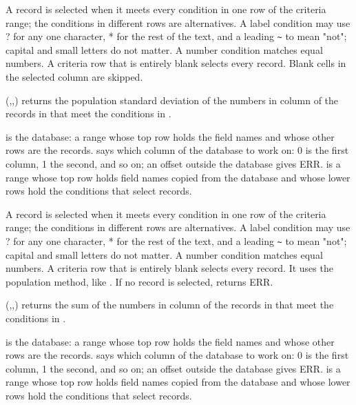 A record is selected when it meets every condition in one row of the criteria range; the conditions in different rows are alternatives. A label condition may use ? for any one character, * for the rest of the text, and a leading \texttt{\textasciitilde} to mean "not"; capital and small letters do not matter. A number condition matches equal numbers. A criteria row that is entirely blank selects every record. Blank cells in the selected column are skipped.

\Examples
{}

(,,) returns the population standard deviation of the numbers in column  of the records in  that meet the conditions in .

 is the database: a range whose top row holds the field names and whose other rows are the records.  says which column of the database to work on: 0 is the first column, 1 the second, and so on; an offset outside the database gives ERR.  is a range whose top row holds field names copied from the database and whose lower rows hold the conditions that select records.

A record is selected when it meets every condition in one row of the criteria range; the conditions in different rows are alternatives. A label condition may use ? for any one character, * for the rest of the text, and a leading \texttt{\textasciitilde} to mean "not"; capital and small letters do not matter. A number condition matches equal numbers. A criteria row that is entirely blank selects every record. It uses the population method, like . If no record is selected,  returns ERR.

\Examples
{}

(,,) returns the sum of the numbers in column  of the records in  that meet the conditions in .

 is the database: a range whose top row holds the field names and whose other rows are the records.  says which column of the database to work on: 0 is the first column, 1 the second, and so on; an offset outside the database gives ERR.  is a range whose top row holds field names copied from the database and whose lower rows hold the conditions that select records.

